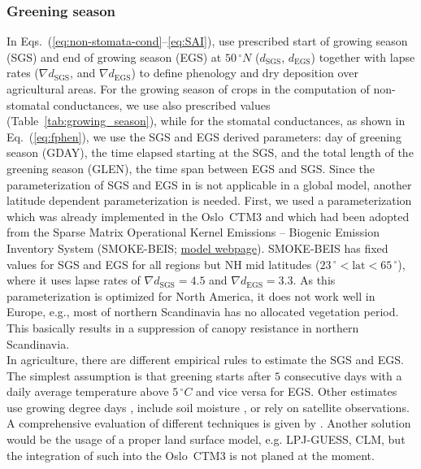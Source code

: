 \documentclass[gmd, manuscript]{copernicus}
\begin{document}
\subsubsection{Greening season}
\label{subsubsec:greening}
In Eqs.~(\ref{eq:non-stomata-cond}--\ref{eq:SAI}), \citet{ACP:Simpson2012} use prescribed start of growing season (SGS) and end of growing season (EGS) at $50\,\unit{^\circ N}$ ($d_\text{SGS}$, $d_\text{EGS}$) together with lapse rates ($\nabla d_\text{SGS}$, and $\nabla d_\text{EGS}$) to define phenology and dry deposition over agricultural areas. For the growing season of crops in the computation of non-stomatal conductances, we use also prescribed values (Table~\ref{tab:growing_season}), while for the stomatal conductances, as shown in Eq.~(\ref{eq:fphen}), we use the SGS and EGS derived parameters: day of greening season (GDAY), the time elapsed starting at the SGS, and the total length of the greening season (GLEN), the time span between EGS and SGS. Since the parameterization of SGS and EGS in \citet{ACP:Simpson2012} is not applicable in a global model, another latitude dependent parameterization is needed. First, we used a parameterization which was already implemented in the Oslo~CTM3 and which had been adopted from the Sparse Matrix Operational Kernel Emissions -- Biogenic Emission Inventory System (SMOKE-BEIS; \href{https://www.epa.gov/air-emissions-modeling/biogenic-emission-inventory-system-beis}{model webpage}). SMOKE-BEIS has fixed values for SGS and EGS for all regions but NH mid latitudes ($23\,\unit{^\circ} < \text{lat} < 65\,\unit{^\circ}$), where it uses lapse rates of $\nabla d_\text{SGS} = 4.5$ and $\nabla d_\text{EGS} = 3.3$. As this parameterization is optimized for North America, it does not work well in Europe, e.g., most of northern Scandinavia has no allocated vegetation period. This basically results in a suppression of canopy resistance in northern Scandinavia.\\ 

In agriculture, there are different empirical rules to estimate the SGS and EGS. The simplest assumption is that greening starts after $5$ consecutive days with a daily average temperature above $5\,\unit{^\circ C}$ and vice versa for EGS. Other estimates use growing degree days \citep{JC:Levis2004,PO:Fu2014}, include soil moisture \citep{GCB:Fu2014}, or rely on satellite observations. A comprehensive evaluation of different techniques is given by \citet{GCB:Anav2017}. Another solution would be the usage of a proper land surface model, e.g. LPJ-GUESS, CLM, but the integration of such into the Oslo~CTM3 is not planed at the moment.
\end{document}
